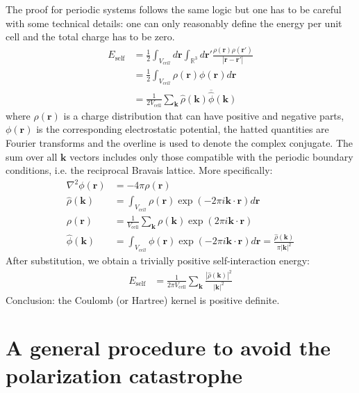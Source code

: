 \documentclass[a4paper,12pt,parskip=half]{scrartcl}
\begin{document}
The proof for periodic systems follows the same logic but one has to be careful with some technical details: one can only reasonably define the energy per unit cell and the total charge has to be zero.
%
\begin{align}
    E_\text{self}
        &= \frac{1}{2} \int_{V_{cell}} d\mathbold{r} \int_{\mathbb{R}^3} d\mathbold{r}' \frac{ \rho(\mathbold{r}) \rho(\mathbold{r}') }{| \mathbold{r} - \mathbold{r}' |} \\
        &= \frac{1}{2} \int_{V_{cell}} \rho(\mathbold{r}) \phi(\mathbold{r}) d\mathbold{r} \\
        &= \frac{1}{2 V_\text{cell}}\sum_{\mathbf{k}} \hat{\rho}(\mathbold{k}) \overline{\hat{\phi}}(\mathbold{k})
\end{align}
%
where $\rho(\mathbold{r})$ is a charge distribution that can have positive and negative parts, $\phi(\mathbold{r})$ is the corresponding electrostatic potential, the hatted quantities are Fourier transforms and the overline is used to denote the complex conjugate. The sum over all $\mathbold{k}$ vectors includes only those compatible with the periodic boundary conditions, i.e. the reciprocal Bravais lattice. More specifically:
%
\begin{align}
    \nabla^2 \phi(\mathbold{r}) &= -4\pi \rho(\mathbold{r}) \\
    \hat{\rho}(\mathbold{k}) &= \int_{V_{cell}} \rho(\mathbold{r}) \exp(-2\pi i \mathbold{k} \cdot \mathbold{r}) d\mathbold{r} \\
    \rho(\mathbold{r}) &= \frac{1}{V_\text{cell}} \sum_{\mathbf{k}} \rho(\mathbold{k}) \exp(2\pi i \mathbold{k} \cdot \mathbold{r}) \\
    \hat{\phi}(\mathbold{k}) &= \int_{V_{cell}}\phi(\mathbold{r}) \exp(-2\pi i \mathbold{k} \cdot \mathbold{r}) d\mathbold{r} = \frac{\hat{\rho}(\mathbold{k})}{\pi |\mathbold{k}|^2}
\end{align}
%
After substitution, we obtain a trivially positive self-interaction energy:
%
\begin{align}
    E_\text{self} &= \frac{1}{2\pi V_\text{cell}} \sum_{\mathbf{k}} \frac{ |\hat{\rho}(\mathbold{k})|^2 }{|\mathbold{k}|^2}
\end{align}
%
Conclusion: the Coulomb (or Hartree) kernel is positive definite.


\section{A general procedure to avoid the polarization catastrophe}
\end{document}
